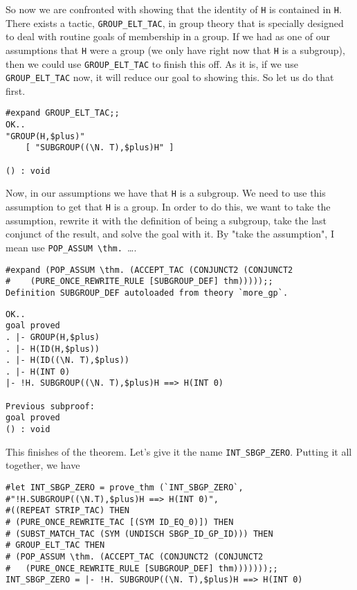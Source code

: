 So now we are confronted with showing that the identity of {\small\tt H}
is contained in {\small\tt H}.  There exists a tactic,
{\small\verb+GROUP_ELT_TAC+}, in group theory that is specially
designed to deal with routine goals of membership in a group.  If we
had as one of our assumptions that {\small\tt H} were a group (we only
have right now that {\small\tt H} is a subgroup), then we could use
{\small\verb+GROUP_ELT_TAC+} to finish this off.  As it is, if we
use {\small\verb+GROUP_ELT_TAC+} now, it will reduce our goal to
showing this.  So let us do that first.
\begin{session}
\begin{verbatim}
#expand GROUP_ELT_TAC;;
OK..
"GROUP(H,$plus)"
    [ "SUBGROUP((\N. T),$plus)H" ]

() : void
\end{verbatim}
\end{session}

Now, in our assumptions we have that {\small\tt H} is a subgroup.  We
need to use this assumption to get that {\small\tt H} is a group.  In
order to do this, we want to take the assumption, rewrite it with the
definition of being a subgroup, take the last conjunct of the result,
and solve the goal with it.  By "take the assumption", I mean use
{{\small\verb+POP_ASSUM \thm. +}\ldots}.
\begin{session}
\begin{verbatim}
#expand (POP_ASSUM \thm. (ACCEPT_TAC (CONJUNCT2 (CONJUNCT2
#    (PURE_ONCE_REWRITE_RULE [SUBGROUP_DEF] thm)))));;
Definition SUBGROUP_DEF autoloaded from theory `more_gp`.
\end{verbatim}
\mvdots
\begin{verbatim}
OK..
goal proved
. |- GROUP(H,$plus)
. |- H(ID(H,$plus))
. |- H(ID((\N. T),$plus))
. |- H(INT 0)
|- !H. SUBGROUP((\N. T),$plus)H ==> H(INT 0)

Previous subproof:
goal proved
() : void
\end{verbatim}
\end{session}

This finishes of the theorem.  Let's give it the name
{\small\verb+INT_SBGP_ZERO+}.  Putting it all together, we have
\begin{session}
\begin{verbatim}
#let INT_SBGP_ZERO = prove_thm (`INT_SBGP_ZERO`,
#"!H.SUBGROUP((\N.T),$plus)H ==> H(INT 0)",
#((REPEAT STRIP_TAC) THEN
# (PURE_ONCE_REWRITE_TAC [(SYM ID_EQ_0)]) THEN
# (SUBST_MATCH_TAC (SYM (UNDISCH SBGP_ID_GP_ID))) THEN
# GROUP_ELT_TAC THEN
# (POP_ASSUM \thm. (ACCEPT_TAC (CONJUNCT2 (CONJUNCT2
#   (PURE_ONCE_REWRITE_RULE [SUBGROUP_DEF] thm)))))));;
INT_SBGP_ZERO = |- !H. SUBGROUP((\N. T),$plus)H ==> H(INT 0)
\end{verbatim}
\end{session}

